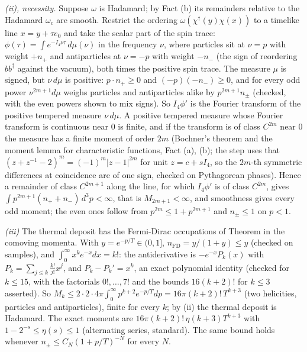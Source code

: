 \emph{(ii), necessity.} Suppose $\omega$ is Hadamard; by Fact (b) its remainders relative to the Hadamard $\omega_{c}$ are smooth. Restrict the ordering $\omega(\chi^{\dagger}(y)\chi(x))$ to a timelike line $x = y + \tau e_{0}$ and take the scalar part of the spin trace: $\phi(\tau) = \int e^{-I_{4}\nu\tau}\,d\mu(\nu)$ in the frequency $\nu$, where particles sit at $\nu = p$ with weight $+n_{+}$ and antiparticles at $\nu = -p$ with weight $-n_{-}$ (the sign of reordering $bb^{\dagger}$ against the vacuum), both times the positive spin trace. The measure $\mu$ is signed, but $\nu\,d\mu$ is positive: $p \cdot n_{+} \ge 0$ and $(-p)(-n_{-}) \ge 0$, and for every odd power $\nu^{2m+1}d\mu$ weighs particles and antiparticles alike by $p^{2m + 1}n_{\pm}$ (checked, with the even powers shown to mix signs). So $I_{4}\phi'$ is the Fourier transform of the positive tempered measure $\nu\,d\mu$. A positive tempered measure whose Fourier transform is continuous near $0$ is finite, and if the transform is of class $C^{2m}$ near $0$ the measure has a finite moment of order $2m$ (Bochner's theorem and the moment lemma for characteristic functions, Fact (a), (b); the step uses that $(z + z^{-1} - 2)^{m} = (-1)^{m}|z - 1|^{2m}$ for unit $z = c + sI_{4}$, so the $2m$-th symmetric differences at coincidence are of one sign, checked on Pythagorean phases). Hence a remainder of class $C^{2m+1}$ along the line, for which $I_{4}\phi'$ is of class $C^{2m}$, gives $\int p^{2m + 1}(n_{+} + n_{-})\,d^{3}p < \infty$, that is $M_{2m+1} < \infty$, and smoothness gives every odd moment; the even ones follow from $p^{2m} \le 1 + p^{2m+1}$ and $n_{\pm} \le 1$ on $p < 1$.

\emph{(iii)} The thermal deposit has the Fermi-Dirac occupations of Theorem  in the comoving momenta. With $y = e^{-p/T} \in (0, 1]$, $n_{\mathrm{FD}} = y/(1 + y) \le y$ (checked on samples), and $\int_{0}^{\infty}x^{k}e^{-x}dx = k!$: the antiderivative is $-e^{-x}P_{k}(x)$ with $P_{k} = \sum_{j \le k}\tfrac{k!}{j!}x^{j}$, and $P_{k} - P_{k}' = x^{k}$, an exact polynomial identity (checked for $k \le 15$, with the factorials $0!, \dots, 7!$ and the bounds $16(k+2)!$ for $k \le 3$ asserted). So $M_{k} \le 2\cdot 2\cdot 4\pi\int_{0}^{\infty}p^{k + 2}e^{-p/T}dp = 16\pi(k + 2)!\,T^{k + 3}$ (two helicities, particles and antiparticles), finite for every $k$; by (ii) the thermal deposit is Hadamard. The exact moments are $16\pi(k + 2)!\,\eta(k + 3)T^{k+3}$ with $1 - 2^{-s} \le \eta(s) \le 1$ (alternating series, standard). The same bound holds whenever $n_{\pm} \le C_{N}(1 + p/T)^{-N}$ for every $N$.

